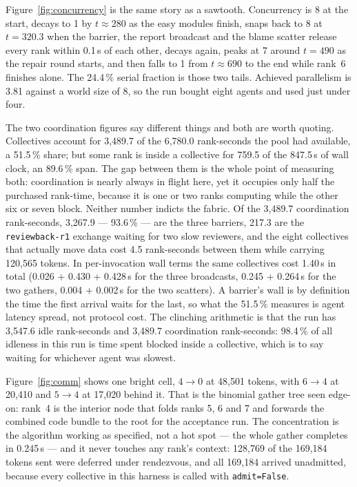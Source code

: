 \documentclass[11pt]{article}
\begin{document}
Figure~\ref{fig:concurrency} is the same story as a sawtooth. Concurrency is 8 at the start,
decays to 1 by $t \approx 280$ as the easy modules finish, snaps back to 8 at $t = 320.3$ when
the barrier, the report broadcast and the blame scatter release every rank within 0.1\,s of each
other, decays again, peaks at 7 around $t = 490$ as the repair round starts, and then falls to 1
from $t \approx 690$ to the end while rank~6 finishes alone. The 24.4\,\% serial fraction is
those two tails. Achieved parallelism is 3.81 against a world size of 8, so the run bought eight
agents and used just under four.

The two coordination figures say different things and both are worth quoting. Collectives
account for 3,489.7 of the 6,780.0 rank-seconds the pool had available, a 51.5\,\% share; but
some rank is inside a collective for 759.5 of the 847.5\,s of wall clock, an 89.6\,\% span. The
gap between them is the whole point of measuring both: coordination is nearly always in flight
here, yet it occupies only half the purchased rank-time, because it is one or two ranks
computing while the other six or seven block. Neither number indicts the fabric. Of the 3,489.7
coordination rank-seconds, 3,267.9 --- 93.6\,\% --- are the three barriers, 217.3 are the
\texttt{reviewback-r1} exchange waiting for two slow reviewers, and the eight collectives that
actually move data cost 4.5 rank-seconds between them while carrying 120,565 tokens. In
per-invocation wall terms the same collectives cost 1.40\,s in total (0.026 + 0.430 + 0.428\,s
for the three broadcasts, 0.245 + 0.264\,s for the two gathers, 0.004 + 0.002\,s for the two
scatters). A barrier's wall is by definition the time the first arrival waits for the last, so
what the 51.5\,\% measures is agent latency spread, not protocol cost. The clinching arithmetic
is that the run has 3,547.6 idle rank-seconds and 3,489.7 coordination rank-seconds: 98.4\,\% of
all idleness in this run is time spent blocked inside a collective, which is to say waiting for
whichever agent was slowest.

Figure~\ref{fig:comm} shows one bright cell, $4 \rightarrow 0$ at 48,501 tokens, with
$6 \rightarrow 4$ at 20,410 and $5 \rightarrow 4$ at 17,020 behind it. That is the binomial
gather tree seen edge-on: rank~4 is the interior node that folds ranks 5, 6 and 7 and forwards
the combined code bundle to the root for the acceptance run. The concentration is the algorithm
working as specified, not a hot spot --- the whole gather completes in 0.245\,s --- and it never
touches any rank's context: 128,769 of the 169,184 tokens sent were deferred under rendezvous,
and all 169,184 arrived unadmitted, because every collective in this harness is called with
\texttt{admit=False}.
\end{document}
